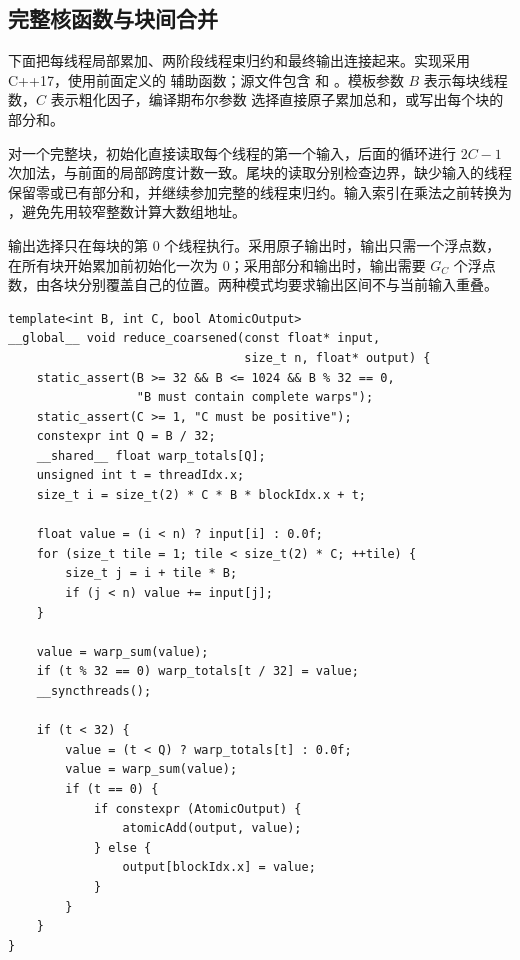 \subsection{完整核函数与块间合并}

下面把每线程局部累加、两阶段线程束归约和最终输出连接起来。实现采用 C++17，使用前面定义的 \mbox{} 辅助函数；源文件包含 \mbox{} 和 \mbox{}。模板参数 $B$ 表示每块线程数，$C$ 表示粗化因子，编译期布尔参数 \mbox{} 选择直接原子累加总和，或写出每个块的部分和。

对一个完整块，初始化直接读取每个线程的第一个输入，后面的循环进行 $2C-1$ 次加法，与前面的局部跨度计数一致。尾块的读取分别检查边界，缺少输入的线程保留零或已有部分和，并继续参加完整的线程束归约。输入索引在乘法之前转换为 \mbox{}，避免先用较窄整数计算大数组地址。

输出选择只在每块的第 $0$ 个线程执行。采用原子输出时，输出只需一个浮点数，在所有块开始累加前初始化一次为 $0$；采用部分和输出时，输出需要 $G_C$ 个浮点数，由各块分别覆盖自己的位置。两种模式均要求输出区间不与当前输入重叠。

\noindent\begin{minipage}{\linewidth}
\begin{lstlisting}[caption={带线程粗化的完整归约核函数},label={l15:lst:code4}]
template<int B, int C, bool AtomicOutput>
__global__ void reduce_coarsened(const float* input,
                                 size_t n, float* output) {
    static_assert(B >= 32 && B <= 1024 && B % 32 == 0,
                  "B must contain complete warps");
    static_assert(C >= 1, "C must be positive");
    constexpr int Q = B / 32;
    __shared__ float warp_totals[Q];
    unsigned int t = threadIdx.x;
    size_t i = size_t(2) * C * B * blockIdx.x + t;

    float value = (i < n) ? input[i] : 0.0f;
    for (size_t tile = 1; tile < size_t(2) * C; ++tile) {
        size_t j = i + tile * B;
        if (j < n) value += input[j];
    }

    value = warp_sum(value);
    if (t % 32 == 0) warp_totals[t / 32] = value;
    __syncthreads();

    if (t < 32) {
        value = (t < Q) ? warp_totals[t] : 0.0f;
        value = warp_sum(value);
        if (t == 0) {
            if constexpr (AtomicOutput) {
                atomicAdd(output, value);
            } else {
                output[blockIdx.x] = value;
            }
        }
    }
}
\end{lstlisting}
\end{minipage}

